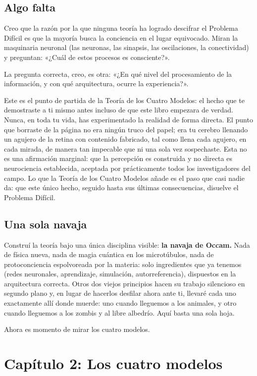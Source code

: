 \documentclass[11pt, twoside, openright]{book}
\begin{document}
\section*{Algo falta}

Creo que la razón por la que ninguna teoría ha logrado descifrar el Problema Difícil es que la mayoría busca la conciencia en el lugar equivocado. Miran la maquinaria neuronal (las neuronas, las sinapsis, las oscilaciones, la conectividad) y preguntan: «¿Cuál de estos procesos es consciente?».

La pregunta correcta, creo, es otra: «¿En qué nivel del procesamiento de la información, y con qué arquitectura, ocurre la experiencia?».

Este es el punto de partida de la Teoría de los Cuatro Modelos: el hecho que te demostraste a ti mismo antes incluso de que este libro empezara de verdad. Nunca, en toda tu vida, has experimentado la realidad de forma directa. El punto que borraste de la página no era ningún truco del papel; era tu cerebro llenando un agujero de la retina con contenido fabricado, tal como llena cada agujero, en cada mirada, de manera tan impecable que ni una sola vez sospechaste. Esta no es una afirmación marginal: que la percepción es construida y no directa es neurociencia establecida, aceptada por prácticamente todos los investigadores del campo. Lo que la Teoría de los Cuatro Modelos añade es el paso que casi nadie da: que este único hecho, seguido hasta sus últimas consecuencias, disuelve el Problema Difícil.

\section*{Una sola navaja}

Construí la teoría bajo una única disciplina visible: \textbf{la navaja de Occam.} Nada de física nueva, nada de magia cuántica en los microtúbulos, nada de protoconciencia espolvoreada por la materia: solo ingredientes que ya tenemos (redes neuronales, aprendizaje, simulación, autorreferencia), dispuestos en la arquitectura correcta. Otros dos viejos principios hacen su trabajo silencioso en segundo plano y, en lugar de hacerlos desfilar ahora ante ti, llevaré cada uno exactamente allí donde muerde: uno cuando lleguemos a los animales, y otro cuando lleguemos a los zombis y al libre albedrío. Aquí basta una sola hoja.

Ahora es momento de mirar los cuatro modelos.


\chapter*{Capítulo 2: Los cuatro modelos}
\end{document}
